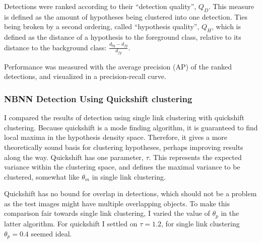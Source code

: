 Detections were ranked according to their ``detection quality'', $Q_D$. This measure is defined as the amount of hypotheses being clustered into one detection. Ties being broken by a second ordering, called ``hypothesis quality'', $Q_H$, which is defined as the distance of a hypothesis to the foreground class, relative to its distance to the background class: $\frac{d_{bg} - d_{fg}}{d_{fg}}$. 

Performance was measured with the average precision (AP) of the ranked detections, and visualized in a precision-recall curve.

\subsubsection{NBNN Detection Using Quickshift clustering} %
\label{sub:nbnn_detection_using_quickshift_clustering}

I compared the results of detection using single link clustering with quickshift clustering. Because quickshift is a mode finding algorithm, it is guaranteed to find local maxima in the hypothesis density space. Therefore, it gives a more theoretically sound basis for clustering hypotheses, perhaps improving results along the way. Quickshift has one parameter, $\tau$. This represents the expected variance within the clustering space, and defines the maximal variance to be clustered, somewhat like $\theta_m$ in single link clustering.

Quickshift has no bound for overlap in detections, which should not be a problem as the test images might have multiple overlapping objects. To make this comparison fair towards single link clustering, I varied the value of $\theta_p$ in the latter algorithm. For quickshift I settled on $\tau = 1.2$, for single link clustering $\theta_p = 0.4$ seemed ideal.

